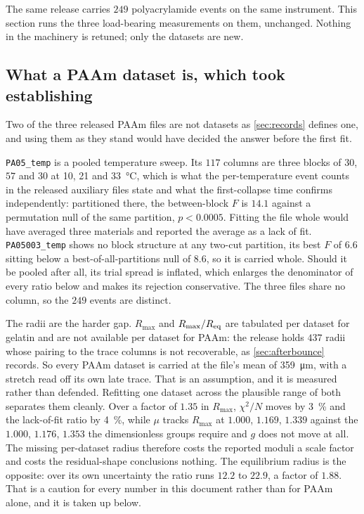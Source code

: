 \documentclass[10pt]{article}
\begin{document}
The same release carries $249$ polyacrylamide events on the same instrument. This section runs
the three load-bearing measurements on them, unchanged. Nothing in the machinery is retuned;
only the datasets are new.

\subsection*{What a PAAm dataset is, which took establishing}

Two of the three released PAAm files are not datasets as \cref{sec:records} defines one, and
using them as they stand would have decided the answer before the first fit.

\texttt{PA05\_temp} is a pooled temperature sweep. Its $117$ columns are three blocks of $30$,
$57$ and $30$ at \SI{10}{}, \SI{21}{} and \SI{33}{\celsius}, which is what the per-temperature
event counts in the released auxiliary files state and what the first-collapse time confirms
independently: partitioned there, the between-block $F$ is $14.1$ against a permutation null of
the same partition, $p < 0.0005$. Fitting the file whole would have averaged three materials
and reported the average as a lack of fit. \texttt{PA05003\_temp} shows no block structure at
any two-cut partition, its best $F$ of $6.6$ sitting below a best-of-all-partitions null of
$8.6$, so it is carried whole. Should it be pooled after all, its trial spread is inflated,
which enlarges the denominator of every ratio below and makes its rejection conservative. The
three files share no column, so the $249$ events are distinct.

The radii are the harder gap. $R_{\max}$ and $R_{\max}/R_{\rm eq}$ are tabulated per dataset for
gelatin and are not available per dataset for PAAm: the release holds $437$ radii whose pairing
to the trace columns is not recoverable, as \cref{sec:afterbounce} records. So every PAAm
dataset is carried at the file's mean of \SI{359}{\micro\metre}, with a stretch read off its own
late trace. That is an assumption, and it is measured rather than defended. Refitting one
dataset across the plausible range of both separates them cleanly. Over a factor of $1.35$ in
$R_{\max}$, $\chi^2/N$ moves by \SI{3}{\percent} and the lack-of-fit ratio by
\SI{4}{\percent}, while $\mu$ tracks $R_{\max}$ at $1.000$, $1.169$, $1.339$ against the
$1.000$, $1.176$, $1.353$ the dimensionless groups require and $g$ does not move at all. The
missing per-dataset radius therefore costs the reported moduli a scale factor and costs the
residual-shape conclusions nothing. The equilibrium radius is the opposite: over its own
uncertainty the ratio runs $12.2$ to $22.9$, a factor of $1.88$. That is a caution for every
number in this document rather than for PAAm alone, and it is taken up below.
\end{document}
